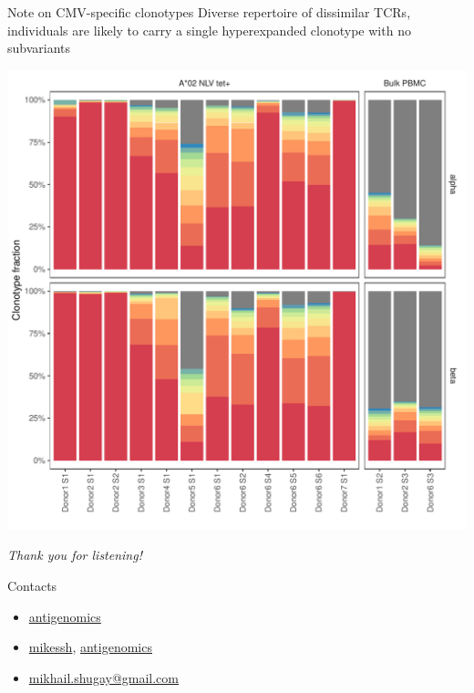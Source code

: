 \documentclass[12pt]{beamer}
\begin{document}
\begin{frame}{Note on CMV-specific clonotypes}
Diverse repertoire of dissimilar TCRs, individuals are likely to carry a single hyperexpanded clonotype with no subvariants
\begin{center}
\includegraphics[scale=0.4]{efig0}
\end{center}
\end{frame}

\begin{frame}{}
\centering\Huge\emph{Thank you for listening!}
\end{frame}

\begin{frame}{Contacts}
\begin{itemize}
\Huge\item[\faTwitter]\quad\href{http://twitter.com/antigenomics}{antigenomics}
\Huge\item[\faGithub]\quad\href{https://github.com/mikessh}{mikessh}, \href{https://github.com/antigenomics}{antigenomics}
\Huge\item[\faEnvelope]\quad\href{mailto: mikhail.shugay@gmail.com}{mikhail.shugay@gmail.com}  \\~\
\end{itemize}
\end{frame}
\end{document}
